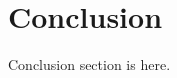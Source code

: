 \documentclass[12pt, a4paper, onecolumn]{article}
\begin{document}
	\section{Conclusion} \label{conclusion}
		Conclusion section is here\cite{Markovski09}.
	
	
	
	
	
	
	
\end{document}
